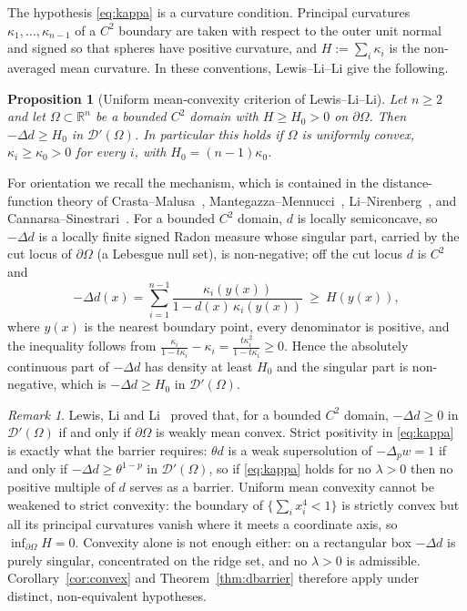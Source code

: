 \documentclass[11pt]{article}
\newcommand{\R}{\mathbb R}
\newtheorem{proposition}[theorem]{Proposition}
\theoremstyle{definition}
\theoremstyle{remark}
\newtheorem{remark}[theorem]{Remark}
\begin{document}
The hypothesis \eqref{eq:kappa} is a curvature condition. Principal
curvatures $\kappa_1,\dots,\kappa_{n-1}$ of a $C^2$ boundary are taken with
respect to the outer unit normal and signed so that spheres have positive
curvature, and $H:=\sum_i\kappa_i$ is the non-averaged mean curvature. In these
conventions, Lewis--Li--Li \cite[Theorem~1.6 and Proposition~3.9]{LewisLiLi2012}
give the following.
\begin{proposition}[Uniform mean-convexity criterion of Lewis--Li--Li]\label{prop:umc}
Let $n\ge2$ and let $\Omega\subset\R^n$ be a bounded $C^2$ domain with
$H\ge H_0>0$ on $\partial\Omega$. Then $-\Delta d\ge H_0$ in
$\mathcal D'(\Omega)$. In particular this holds if $\Omega$ is uniformly
convex, $\kappa_i\ge\kappa_0>0$ for every $i$, with $H_0=(n-1)\kappa_0$.
\end{proposition}

For orientation we recall the mechanism, which is contained in the
distance-function theory of Crasta--Malusa~\cite{CrastaMalusa},
Mantegazza--Mennucci~\cite{MM}, Li--Nirenberg~\cite{LiNir}, and
Cannarsa--Sinestrari~\cite[Ch.~3]{CS}. For a bounded $C^2$ domain, $d$ is
locally semiconcave, so $-\Delta d$ is a locally finite signed Radon measure
whose singular part, carried by the cut locus of $\partial\Omega$ (a Lebesgue
null set), is non-negative; off the cut locus $d$ is $C^2$ and
\begin{equation}\label{eq:reg-set-formula}
-\Delta d(x)=\sum_{i=1}^{n-1}\frac{\kappa_i(y(x))}{1-d(x)\,\kappa_i(y(x))}
\ \ge\ H(y(x)),
\end{equation}
where $y(x)$ is the nearest boundary point, every denominator is positive, and
the inequality follows from
$\frac{\kappa_i}{1-t\kappa_i}-\kappa_i=\frac{t\kappa_i^2}{1-t\kappa_i}\ge0$.
Hence the absolutely continuous part of $-\Delta d$ has density at least
$H_0$ and the singular part is non-negative, which is $-\Delta d\ge H_0$ in
$\mathcal D'(\Omega)$.

\begin{remark}\label{rem:LLL}
Lewis, Li and Li~\cite[Theorem~1.7]{LewisLiLi2012} proved that, for a bounded
$C^2$ domain, $-\Delta d\ge0$ in $\mathcal D'(\Omega)$ if and only if
$\partial\Omega$ is weakly mean convex. Strict positivity in \eqref{eq:kappa}
is exactly what the barrier requires: $\theta d$ is a weak supersolution of
$-\Delta_pw=1$ if and only if $-\Delta d\ge\theta^{1-p}$ in
$\mathcal D'(\Omega)$, so if \eqref{eq:kappa} holds for no $\lambda>0$ then no
positive multiple of $d$ serves as a barrier. Uniform mean convexity cannot be
weakened to strict convexity: the boundary of $\{\sum_ix_i^4<1\}$ is strictly
convex but all its principal curvatures vanish where it meets a coordinate
axis, so $\inf_{\partial\Omega}H=0$. Convexity alone is not enough either: on
a rectangular box $-\Delta d$ is purely singular, concentrated on the ridge
set, and no $\lambda>0$ is admissible. Corollary~\ref{cor:convex} and
Theorem~\ref{thm:dbarrier} therefore apply under distinct, non-equivalent
hypotheses.
\end{remark}
\end{document}
